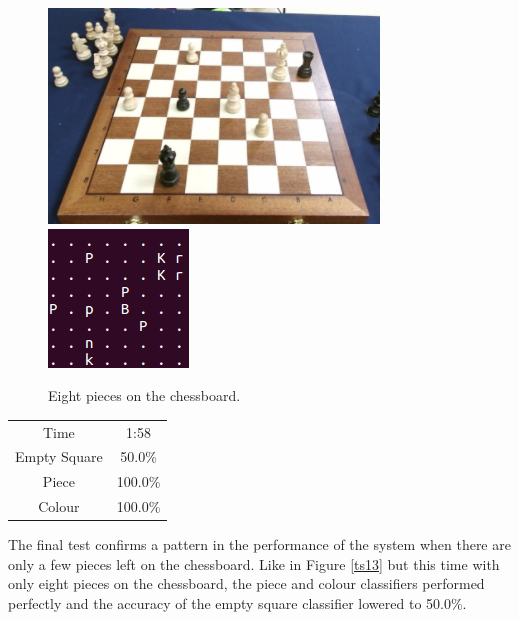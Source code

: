 \documentclass{l4proj}
\begin{document}
\vspace{10mm}
\begin{figure}[h!]
\centering
\includegraphics[scale=0.8]{ts/ts14.png} \includegraphics[scale=0.75]{ts/tsd14.png}
\caption{Eight pieces on the chessboard.}
\label{ts14}
\end{figure}

\begin{table}[h!]
\centering
\begin{tabular}{|c|c|}

	\hline
	Time & 1:58 \\
	\rowcolor{brown!45}Empty Square & 50.0\%  \\
	Piece & 100.0\% \\
	\rowcolor{brown!45} Colour & 100.0\% \\
	\hline
\end{tabular}
\end{table}

\vspace{10mm}
The final test confirms a pattern in the performance of the system when there are only a few pieces left on the chessboard. Like in Figure \ref{ts13} but this time with only eight pieces on the chessboard, the piece and colour classifiers performed perfectly and the accuracy of the empty square classifier lowered to 50.0\%.
\end{document}
